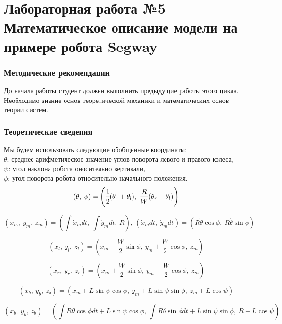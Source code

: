 \documentclass[12pt,a4paper,openany]{extarticle}
\begin{document}
\part*{Лабораторная работа №5\\
 Математическое описание модели на примере робота Segway}
\section{Методические рекомендации}
До начала работы студент должен выполнить предыдущие работы этого цикла. Необходимо знание основ теоретической механики и математических основ теории систем.
\section{Теоретические сведения}
Мы будем использовать следующие обобщенные координаты:\\
$\theta$: среднее арифметическое значение углов поворота левого и правого колеса,\\
$\psi$: угол наклона робота оносительно вертикали,\\
$\phi$: угол поворота робота относительно начального положения.\\

\begin{equation}
(\theta ,\ \phi)=\left(\cfrac12(\theta_r+\theta_l),\ \frac{R}{W}(\theta_r-\theta_l)\right)
\end{equation}

\begin{equation}
(x_m,\ y_m,\ z_m)=(\int\dot{x}_mdt,\ \int\dot{y}_mdt,\ R),\ 
(\dot{x}_mdt,\ \dot{y}_mdt)=(R\dot{\theta}\cos\phi ,\ R\dot{\theta}\sin\phi)
\end{equation}

\begin{equation}
(x_l,\ y_l,\ z_l)=\left(x_m-\frac{W}{2}\sin\phi ,\ y_m+\frac{W}{2}\cos\phi ,\ z_m\right)
\end{equation}

\begin{equation}
(x_r,\ y_r,\ z_r)=\left(x_m+\frac{W}{2}\sin\phi ,\ y_m-\frac{W}{2}\cos\phi ,\ z_m\right)
\end{equation}

\begin{equation}
(x_b,\ y_b,\ z_b)=\left(x_m+L\sin\psi\cos\phi ,\ y_m+L\sin\psi\sin\phi ,\ z_m+L\cos\psi \right)
\end{equation}

\begin{equation}
(x_b,\ y_b,\ z_b)=\left(\int R\dot{\theta}\cos\phi dt+L\sin\psi\cos\phi ,\ 
\int R\dot{\theta}\sin\phi dt+L\sin\psi\sin\phi ,\ R+L\cos\psi \right)
\end{equation}
\end{document}
